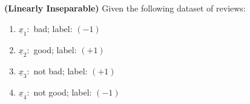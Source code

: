 \documentclass{article}
\renewcommand{\vec}[1]{\underline{#1}}
\theoremstyle{definition}
\begin{document}
\begin{question}
\begin{question}
		
		\item \textbf{(Linearly Inseparable)} Given the following dataset of reviews:
		\begin{enumerate}
			\item $\underline{x}_1:$ bad; label: $(-1)$
			\item $\underline{x}_2:$ good; label: $(+1)$
			\item $\underline{x}_3:$ not bad; label: $(+1)$
			\item $\underline{x}_4:$ not good; label: $(-1)$
		\end{enumerate}
		

\end{question}
\end{question}
\end{document}
